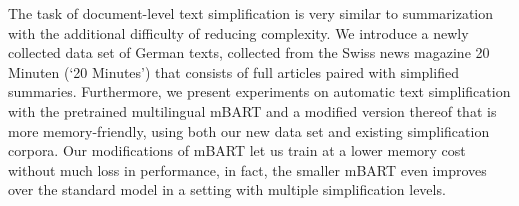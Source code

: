 The task of document-level text simplification is very similar to summarization with the additional difficulty of reducing complexity. We introduce a newly collected data set of German texts, collected from the Swiss news magazine 20 Minuten (`20 Minutes') that consists of full articles paired with simplified summaries. Furthermore, we present experiments on automatic text simplification with the pretrained multilingual mBART and a modified version thereof that is more memory-friendly, using both our new data set and existing simplification corpora. Our modifications of mBART let us train at a lower memory cost without much loss in performance, in fact, the smaller mBART even improves over the standard model in a setting with multiple simplification levels.

